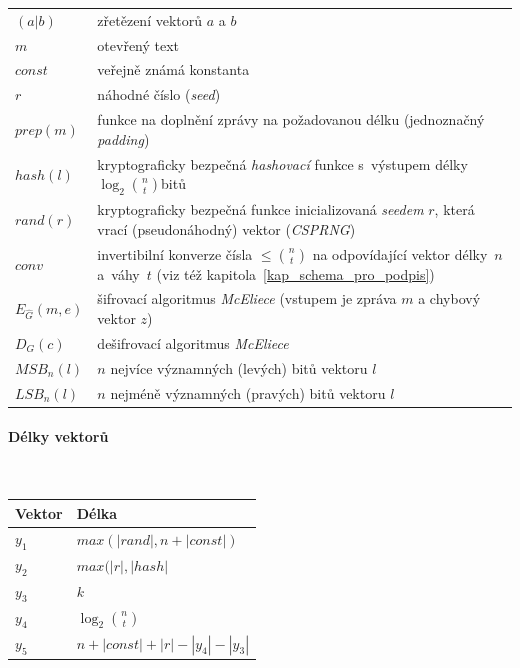 \documentclass[thesis=M,czech,hidelinks]{FITthesis}[2012/06/26]
\newcommand{\0}{{\textcolor[gray]{0.80}{0}}}
\begin{document}
\begin{center}
\begin{tabular}{l p{10cm}}
    $(a|b)$         &   zřetězení vektorů $a$ a $b$ \\
    $m$             &   otevřený text \\
    $const$         &   veřejně známá konstanta \\
    $r$             &   náhodné číslo (\emph{seed}) \\
    $prep(m)$       &   funkce na doplnění zprávy na požadovanou délku
                        (jednoznačný \emph{padding}) \\
    $hash(l)$       &   kryptograficky bezpečná \emph{hashovací} funkce
                        s~výstupem délky $\log_2 \binom{n}{t}$\;bitů \\
    $rand(r)$       &   kryptograficky bezpečná funkce inicializovaná
                        \emph{seedem} $r$, která vrací (pseudonáhodný) vektor
                        (\emph{CSPRNG}) \\
    $conv$          &   invertibilní konverze čísla $\leq \binom{n}{t}$ na
                        odpovídající vektor délky~$n$ a~váhy~$t$ (viz též
                        kapitola~\ref{kap_schema_pro_podpis}) \\
    $E_{\hat{G}}(m,e)$
                    &   šifrovací algoritmus \emph{McEliece} (vstupem je
                        zpráva $m$ a chybový vektor $z$) \\
    $D_G(c)$        &   dešifrovací algoritmus \emph{McEliece} \\
    $MSB_n(l)$      &   $n$ nejvíce významných (levých) bitů vektoru $l$ \\
    $LSB_n(l)$      &   $n$ nejméně významných (pravých) bitů vektoru $l$ \\
\end{tabular}
\end{center}

\paragraph{Délky vektorů} \hfil \\
\begin{center}
\begin{tabular}{l l}
    Vektor      & Délka                                 \\
    \hline
    $y_1$       & $max(|rand|, n+|const|)$              \\
    $y_2$       & $max(|r|,|hash|$                      \\
    $y_3$       & $k$                                   \\
    $y_4$       & $\log_2 \binom{n}{t}$                 \\
    $y_5$       & $n + |const| + |r| - |y_4| - |y_3|$   \\
\end{tabular}
\end{center}
\end{document}

